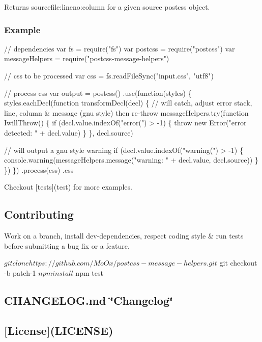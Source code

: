 Returns {\ttfamily sourcefile\+:lineno\+:column} for a given {\ttfamily source} postcss object.

\subsubsection*{Example}


\begin{DoxyCode}
// dependencies
var fs = require("fs")
var postcss = require("postcss")
var messageHelpers = require("postcss-message-helpers")

// css to be processed
var css = fs.readFileSync("input.css", "utf8")

// process css
var output = postcss()
  .use(function(styles) \{
    styles.eachDecl(function transformDecl(decl) \{
      // will catch, adjust error stack, line, column & message (gnu style) then re-throw
      messageHelpers.try(function IwillThrow() \{
        if (decl.value.indexOf("error(") > -1) \{
          throw new Error("error detected: " + decl.value)
        \}
      \}, decl.source)

      // will output a gnu style warning
      if (decl.value.indexOf("warning(") > -1) \{
        console.warning(messageHelpers.message("warning: " + decl.value, decl.source))
      \}
    \})
  \})
  .process(css)
  .css
\end{DoxyCode}


Checkout \mbox{[}tests\mbox{]}(test) for more examples. 



\subsection*{Contributing}

Work on a branch, install dev-\/dependencies, respect coding style \& run tests before submitting a bug fix or a feature. \begin{DoxyVerb}$ git clone https://github.com/MoOx/postcss-message-helpers.git
$ git checkout -b patch-1
$ npm install
$ npm test
\end{DoxyVerb}


\subsection*{C\+H\+A\+N\+G\+E\+L\+O\+G.\+md \char`\"{}\+Changelog\char`\"{}}

\subsection*{\mbox{[}License\mbox{]}(L\+I\+C\+E\+N\+SE)}